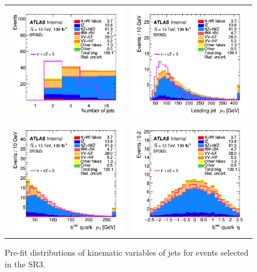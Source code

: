 \begin{figure}[]
	\centering
	\begin{tabular}{cc}
		\includegraphics[width=.35\textwidth]{Appendices/AP5/figures/SR3_UsingDL1rc/nJets} &
		\includegraphics[width=.35\textwidth]{Appendices/AP5/figures/SR3_UsingDL1rc/jet_pt} \\
		\includegraphics[width=.35\textwidth]{Appendices/AP5/figures/SR3_UsingDL1rc/b_pt} & 
		\includegraphics[width=.35\textwidth]{Appendices/AP5/figures/SR3_UsingDL1rc/b_eta} \\
	\end{tabular}
	\caption{Pre-fit distributions of kinematic variables of jets for events selected in the SR3\tZc.
		\ErrStatOnly
		\Blinded
	}%
	\label{fig:sel:sr3:jets}
\end{figure}

\clearpage
\FloatBarrier

